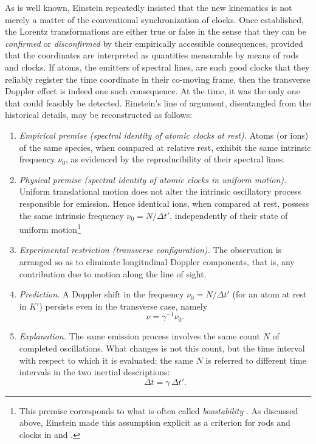 \documentclass[pdflatex]{sn-jnl}
\newcommand{\tDe}{transverse Doppler effect\xspace}
\begin{document}
As is well known, Einstein repeatedly insisted that the new kinematics is not merely a matter of the conventional synchronization of clocks. Once established, the Lorentz transformations are either true or false in the sense that they can be \emph{confirmed} or \emph{disconfirmed} by their empirically accessible consequences, provided that the coordinates are interpreted as quantities measurable by means of  rods and clocks. If atoms, the emitters of spectral lines, are such good clocks that they reliably register the time coordinate in their co-moving frame, then the \tDe is indeed one such consequence. At the time, it was the only one that could feasibly be detected. Einstein’s line of argument, disentangled from the historical details, may be reconstructed as follows:
%
\begin{enumerate}
\item \emph{Empirical premise (spectral identity of atomic clocks at rest).}  
Atoms (or ions) of the same species, when compared at relative rest, exhibit the same intrinsic frequency $\nu_0$, as evidenced by the reproducibility of their spectral lines.

\item \emph{Physical premise (spectral identity of atomic clocks in uniform motion).} Uniform translational motion does not alter the intrinsic oscillatory process responsible for emission. Hence identical ions, when compared at rest, possess the same intrinsic frequency \(\nu_0=N/\Delta t'\), independently of their state of uniform motion\footnote{This premise corresponds to what is often called \emph{boostability} \citep[30, 81, 121]{Brown2005}. As discussed above, Einstein made this assumption explicit as a criterion for  rods and clocks in \citealp[420]{Einstein1908} and \citealp[126][]{Einstein1910}.}

\item \emph{Experimental restriction (transverse configuration).}  
The observation is arranged so as to eliminate longitudinal Doppler components, that is, any contribution due to motion along the line of sight.

\item \emph{Prediction.}  
A Doppler shift in the frequency $\nu_0=N/\Delta t'$ (for an atom at rest in $K'$) persists even in the transverse case, namely
\[
\nu = \gamma^{-1}\nu_0 .
\]

\item \emph{Explanation.}
The same emission process involves the same count \(N\) of completed oscillations. What changes is not this count, but the time interval with respect to which it is evaluated: the same \(N\) is referred to different time intervals in the two inertial descriptions:
\[
\Delta t = \gamma\,\Delta t'.
\]
\end{enumerate}
\end{document}
